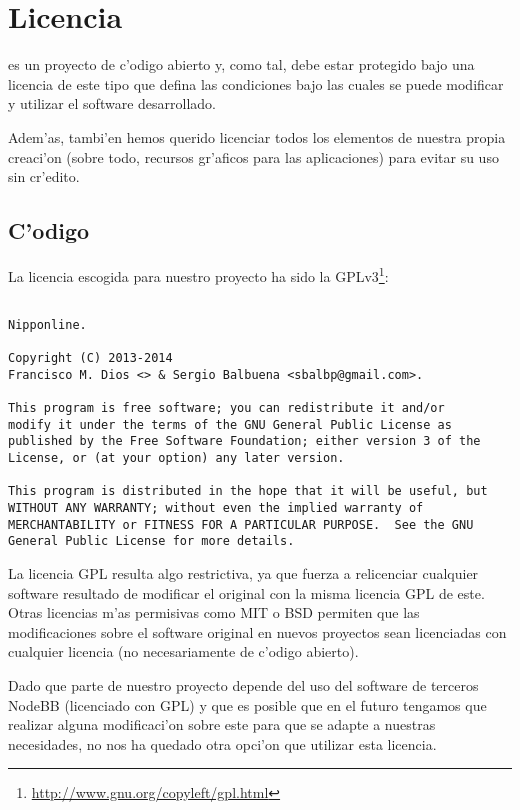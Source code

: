 \section{Licencia}
\label{sub:licencia}

\Nipponline{} es un proyecto de c'odigo abierto y, como tal, debe estar protegido bajo una licencia de este tipo que 
defina las condiciones bajo las cuales se puede modificar y utilizar el software desarrollado.

Adem'as, tambi'en hemos querido licenciar todos los elementos de nuestra propia creaci'on (sobre todo, recursos gr'aficos 
para las aplicaciones) para evitar su uso sin cr'edito.

\subsection{C'odigo}
\label{sub:licencia_codigo}

La licencia escogida para nuestro proyecto \Nipponline{} ha sido la GPLv3\footnote{\url{http://www.gnu.org/copyleft/gpl.html}}:

\begin{verbatim}

Nipponline.

Copyright (C) 2013-2014 
Francisco M. Dios <> & Sergio Balbuena <sbalbp@gmail.com>.

This program is free software; you can redistribute it and/or
modify it under the terms of the GNU General Public License as
published by the Free Software Foundation; either version 3 of the
License, or (at your option) any later version.

This program is distributed in the hope that it will be useful, but
WITHOUT ANY WARRANTY; without even the implied warranty of
MERCHANTABILITY or FITNESS FOR A PARTICULAR PURPOSE.  See the GNU
General Public License for more details.

\end{verbatim}

La licencia GPL resulta algo restrictiva, ya que fuerza a relicenciar cualquier software resultado de modificar el
original con la misma licencia GPL de este. Otras licencias m'as permisivas como MIT o BSD permiten que las 
modificaciones sobre el software original en nuevos proyectos sean licenciadas con cualquier licencia (no 
necesariamente de c'odigo abierto).

Dado que parte de nuestro proyecto depende del uso del software de terceros NodeBB (licenciado con GPL) y que es 
posible que en el futuro tengamos que realizar alguna modificaci'on sobre este para que se adapte a nuestras necesidades,
 no nos ha quedado otra opci'on que utilizar esta licencia.
 
